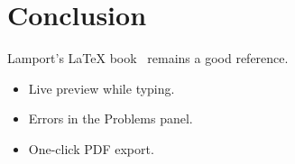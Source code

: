 \section{Conclusion}
Lamport's \LaTeX{} book~\cite{lamport1994} remains a good reference.
\begin{itemize}
  \item Live preview while typing.
  \item Errors in the Problems panel.
  \item One-click PDF export.
\end{itemize}
